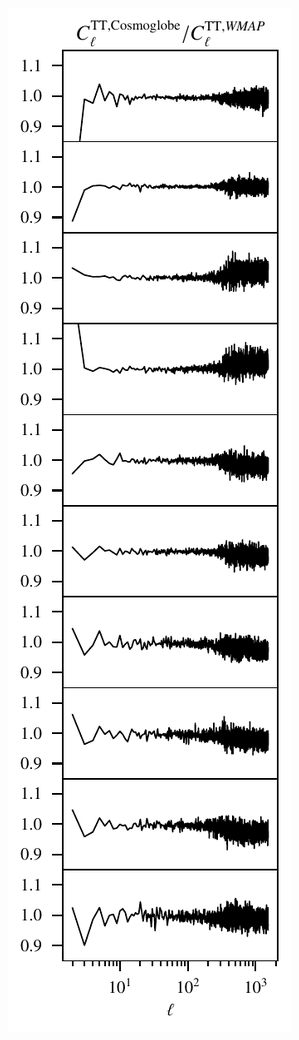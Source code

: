 \documentclass[twocolumn]{../../common/aa}
\begin{document}
\begin{figure}
	\centering
	\includegraphics{figures/TT_ratio.pdf}

\end{figure}
\end{document}
